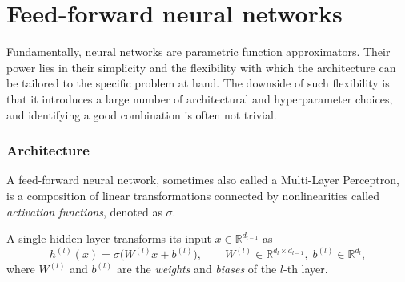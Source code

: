 %
%
%



\chapter{Feed-forward neural networks}
%
%
%



Fundamentally, neural networks are parametric function approximators.
Their power lies in their simplicity and the flexibility with which the architecture can be tailored to the specific problem at hand.
The downside of such flexibility is that it introduces a large number of architectural and hyperparameter choices, and identifying a good combination is often not trivial.

\subsection{Architecture}

A feed-forward neural network, sometimes also called a Multi-Layer Perceptron,
is a composition of linear transformations connected by nonlinearities called \emph{activation functions},
denoted as $\sigma$.

A single hidden layer transforms its input $x \in \mathbb{R}^{d_{l-1}}$ as
$$
h^{(l)}(x) = \sigma\!\bigl(W^{(l)} x + b^{(l)}\bigr),
\qquad W^{(l)} \in \mathbb{R}^{d_l \times d_{l-1}}, \; b^{(l)} \in \mathbb{R}^{d_l},
$$
where $W^{(l)}$ and $b^{(l)}$ are the \emph{weights} and \emph{biases} of the $l$-th layer.

